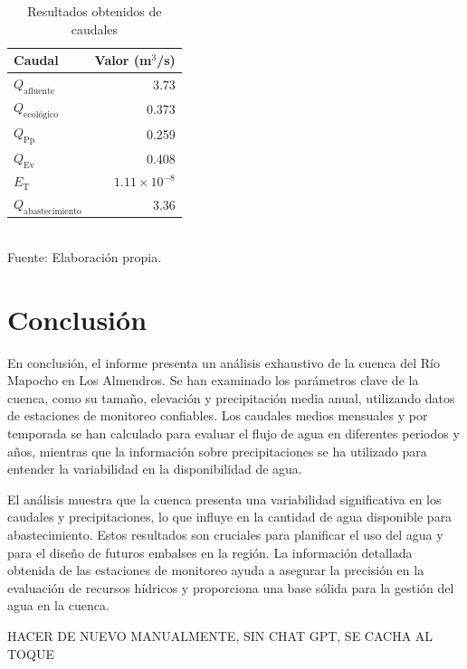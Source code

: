 \documentclass{article} %
\begin{document}
\begin{table}[h]
    \centering
    \caption{Resultados obtenidos de caudales}
    \vspace{0.2cm}
    \begin{tabular}{lr}
        \toprule
        \textbf{Caudal} & \textbf{Valor (m\(^3\)/s)} \\
        \midrule
        \(Q_{\text{afluente}}\) & 3.73 \\
        \(Q_{\text{ecológico}}\) & 0.373 \\
        \(Q_{\text{Pp}}\) & 0.259 \\
        \(Q_{\text{Ev}}\) & 0.408 \\
        \(E_{\text{T}}\) & \(1.11 \times 10^{-8}\) \\
        \(Q_{\text{abastecimiento}}\) & 3.36 \\
        \bottomrule
    \end{tabular}
    \vspace{0.2cm}
    \\Fuente: Elaboración propia.
\end{table}

\newpage
\section{Conclusión}
En conclusión, el informe presenta un análisis exhaustivo de la cuenca del Río Mapocho en Los Almendros. Se han examinado los parámetros clave de la cuenca, como su tamaño, elevación y precipitación media anual, utilizando datos de estaciones de monitoreo confiables. Los caudales medios mensuales y por temporada se han calculado para evaluar el flujo de agua en diferentes periodos y años, mientras que la información sobre precipitaciones se ha utilizado para entender la variabilidad en la disponibilidad de agua.

El análisis muestra que la cuenca presenta una variabilidad significativa en los caudales y precipitaciones, lo que influye en la cantidad de agua disponible para abastecimiento. Estos resultados son cruciales para planificar el uso del agua y para el diseño de futuros embalses en la región. La información detallada obtenida de las estaciones de monitoreo ayuda a asegurar la precisión en la evaluación de recursos hídricos y proporciona una base sólida para la gestión del agua en la cuenca.

HACER DE NUEVO MANUALMENTE, SIN CHAT GPT, SE CACHA AL TOQUE
\end{document}

